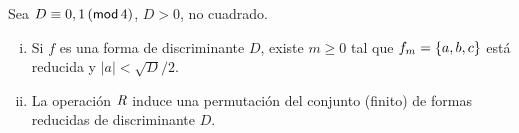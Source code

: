 % 

\begin{lemaIndefinidas}\label{lema:indefinidas}
	Sea $D\equiv 0,1\tmodulo[4]$, $D>0$, no cuadrado.
	\begin{enumerate}[(i)]
		\item\label{item:lema:indefinidas:reduccion}
			Si $f$ es una forma de discriminante $D$,
			existe $m\geq 0$ tal que $f_m=\binaria{a,b,c}$
			est\'a reducida y $|a|<\sqrt D/2$.
		\item\label{item:lema:indefinidas:vecina}
			La operaci\'on $\rneigh$ induce una permutaci\'on
			del conjunto (finito) de formas reducidas de
			discriminante $D$.
	\end{enumerate}
\end{lemaIndefinidas}

